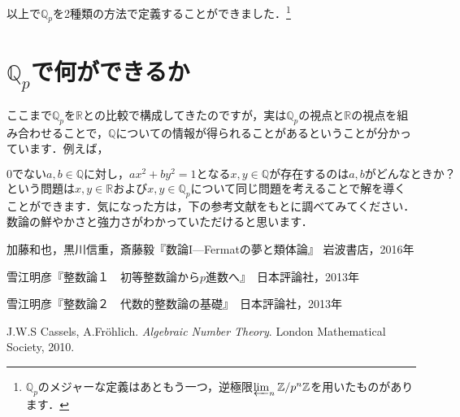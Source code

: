 \documentclass[./main]{subfiles}
\theoremstyle{definition}
\newcommand{\Z}{\mathbb{Z}}%
\newcommand{\Q}{\mathbb{Q}}%
\newcommand{\Qp}{\mathbb{Q}_p}%
\newcommand{\R}{\mathbb{R}}%
\begin{document}
以上で$\Qp$を2種類の方法で定義することができました．\footnote{$\Qp$のメジャーな定義はあともう一つ，逆極限$\varprojlim_n \Z / p^n\Z$を用いたものがあります．}


\section{$\Qp$で何ができるか}

ここまで$\Qp$を$\R$との比較で構成してきたのですが，実は$\Qp$の視点と$\R$の視点を組み合わせることで，$\Q$についての情報が得られることがあるということが分かっています．例えば，

\begin{equation*}
0でないa,b \in \Q に対し，ax^2+by^2=1となるx,y \in \Q が存在するのはa,bがどんなときか？
\end{equation*}
という問題は$x,y \in \R$および$x,y \in \Qp$について同じ問題を考えることで解を導くことができます．気になった方は，下の参考文献をもとに調べてみてください．数論の鮮やかさと強力さがわかっていただけると思います．

\begin{thebibliography}{9}

\item 加藤和也，黒川信重，斎藤毅『数論I---Fermatの夢と類体論』 岩波書店，2016年
\item 雪江明彦『整数論１　初等整数論から$p$進数へ』　日本評論社，2013年
\item 雪江明彦『整数論２　代数的整数論の基礎』　日本評論社，2013年
\item J.W.S Cassels, A.Fr\"ohlich. \textit{Algebraic Number Theory}. London Mathematical Society, 2010.

\end{thebibliography}
\end{document}
